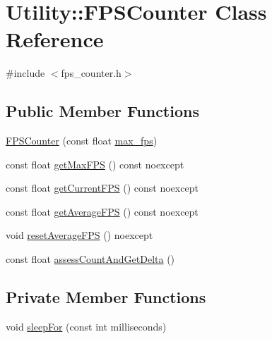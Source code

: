 \hypertarget{class_utility_1_1_f_p_s_counter}{}\section{Utility\+:\+:F\+P\+S\+Counter Class Reference}
\label{class_utility_1_1_f_p_s_counter}


{\ttfamily \#include $<$fps\+\_\+counter.\+h$>$}

\subsection*{Public Member Functions}
\begin{DoxyCompactItemize}
\item 
\hyperlink{class_utility_1_1_f_p_s_counter_a5e76d827002c0d0e4217f43b998d6f1e}{F\+P\+S\+Counter} (const float \hyperlink{class_utility_1_1_f_p_s_counter_a148c5309c9d72773cd39d5bb791642d4}{max\+\_\+fps})
\item 
const float \hyperlink{class_utility_1_1_f_p_s_counter_a11077d4a419a31bbd254103b68e3956b}{get\+Max\+F\+P\+S} () const noexcept
\item 
const float \hyperlink{class_utility_1_1_f_p_s_counter_a79f4857494606837a23c545d0f7e5917}{get\+Current\+F\+P\+S} () const noexcept
\item 
const float \hyperlink{class_utility_1_1_f_p_s_counter_af30e85894cd28030f940973d7c38b678}{get\+Average\+F\+P\+S} () const noexcept
\item 
void \hyperlink{class_utility_1_1_f_p_s_counter_a80612f3c0a69bafdb226a2ba9f997b0d}{reset\+Average\+F\+P\+S} () noexcept
\item 
const float \hyperlink{class_utility_1_1_f_p_s_counter_aa068e564c963cbc82ebacffac9201a90}{assess\+Count\+And\+Get\+Delta} ()
\end{DoxyCompactItemize}
\subsection*{Private Member Functions}
\begin{DoxyCompactItemize}
\item 
void \hyperlink{class_utility_1_1_f_p_s_counter_ae99416b7341249e9deaf227e66d908ea}{sleep\+For} (const int milliseconds)
\end{DoxyCompactItemize}
